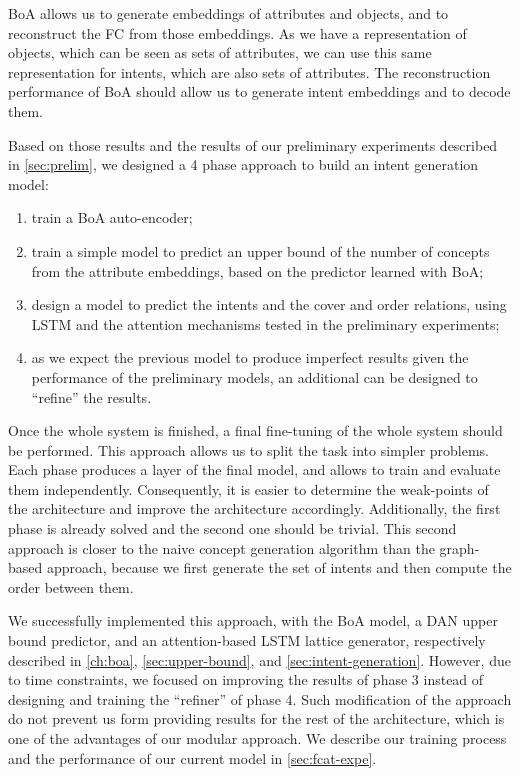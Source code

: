 BoA allows us to generate embeddings of attributes and objects, and to reconstruct the FC from those embeddings.
As we have a representation of objects, which can be seen as sets of attributes, we can use this same representation for intents, which are also sets of attributes.
The reconstruction performance of BoA should allow us to generate intent embeddings and to decode them.


Based on those results and the results of our preliminary experiments described in \cref{sec:prelim}, we designed a 4 phase approach to build an intent generation model:
\begin{enumerate}
    \item train a BoA auto-encoder;
    \item train a simple model to predict an upper bound of the number of concepts from the attribute embeddings, based on the predictor learned with BoA;
    \item design a model to predict the intents and the cover and order relations, using LSTM and the attention mechanisms tested in the preliminary experiments;
    \item as we expect the previous model to produce imperfect results given the performance of the preliminary models, an additional can be designed to ``refine'' the results.
\end{enumerate}
Once the whole system is finished, a final fine-tuning of the whole system should be performed.
%
This approach allows us to split the task into simpler problems.
Each phase produces a layer of the final model, and allows to train and evaluate them independently.
Consequently, it is easier to determine the weak-points of the architecture and improve the architecture accordingly.
Additionally, the first phase is already solved and the second one should be trivial.
This second approach is closer to the naive concept generation algorithm than the graph-based approach, because we first generate the set of intents and then compute the order between them.

We successfully implemented this approach, with the BoA model, a DAN upper bound predictor, and an attention-based LSTM lattice generator, respectively described in \cref{ch:boa}, \cref{sec:upper-bound}, and \cref{sec:intent-generation}.
However, due to time constraints, we focused on improving the results of phase 3 instead of designing and training the ``refiner'' of phase 4.
Such modification of the approach do not prevent us form providing results for the rest of the architecture, which is one of the advantages of our modular approach.
We describe our training process and the performance of our current model in \cref{sec:fcat-expe}.




